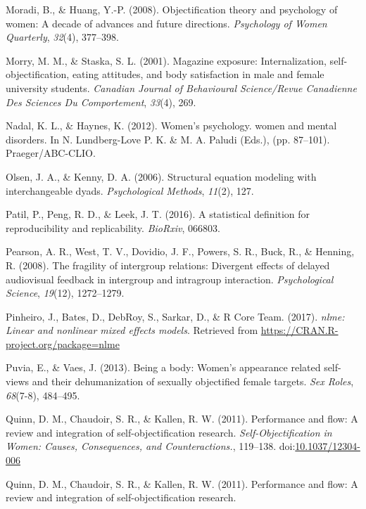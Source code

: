 \documentclass[man]{apa6}
\begin{document}
\hypertarget{ref-moradi2008}{}
Moradi, B., \& Huang, Y.-P. (2008). Objectification theory and
psychology of women: A decade of advances and future directions.
\emph{Psychology of Women Quarterly}, \emph{32}(4), 377--398.

\hypertarget{ref-morry2001magazine}{}
Morry, M. M., \& Staska, S. L. (2001). Magazine exposure:
Internalization, self-objectification, eating attitudes, and body
satisfaction in male and female university students. \emph{Canadian
Journal of Behavioural Science/Revue Canadienne Des Sciences Du
Comportement}, \emph{33}(4), 269.

\hypertarget{ref-nadal2012effects}{}
Nadal, K. L., \& Haynes, K. (2012). Women's psychology. women and mental
disorders. In N. Lundberg-Love P. K. \& M. A. Paludi (Eds.), (pp.
87--101). Praeger/ABC-CLIO.

\hypertarget{ref-olsen2006structural}{}
Olsen, J. A., \& Kenny, D. A. (2006). Structural equation modeling with
interchangeable dyads. \emph{Psychological Methods}, \emph{11}(2), 127.

\hypertarget{ref-patil2016statistical}{}
Patil, P., Peng, R. D., \& Leek, J. T. (2016). A statistical definition
for reproducibility and replicability. \emph{BioRxiv}, 066803.

\hypertarget{ref-pearson2008fragility}{}
Pearson, A. R., West, T. V., Dovidio, J. F., Powers, S. R., Buck, R., \&
Henning, R. (2008). The fragility of intergroup relations: Divergent
effects of delayed audiovisual feedback in intergroup and intragroup
interaction. \emph{Psychological Science}, \emph{19}(12), 1272--1279.

\hypertarget{ref-R-nlme}{}
Pinheiro, J., Bates, D., DebRoy, S., Sarkar, D., \& R Core Team. (2017).
\emph{nlme: Linear and nonlinear mixed effects models}. Retrieved from
\url{https://CRAN.R-project.org/package=nlme}

\hypertarget{ref-puvia2013being}{}
Puvia, E., \& Vaes, J. (2013). Being a body: Women's appearance related
self-views and their dehumanization of sexually objectified female
targets. \emph{Sex Roles}, \emph{68}(7-8), 484--495.

\hypertarget{ref-quinnetal}{}
Quinn, D. M., Chaudoir, S. R., \& Kallen, R. W. (2011). Performance and
flow: A review and integration of self-objectification research.
\emph{Self-Objectification in Women: Causes, Consequences, and
Counteractions.}, 119--138.
doi:\href{https://doi.org/10.1037/12304-006}{10.1037/12304-006}

\hypertarget{ref-quinn2011performance}{}
Quinn, D. M., Chaudoir, S. R., \& Kallen, R. W. (2011). Performance and
flow: A review and integration of self-objectification research.
\end{document}
